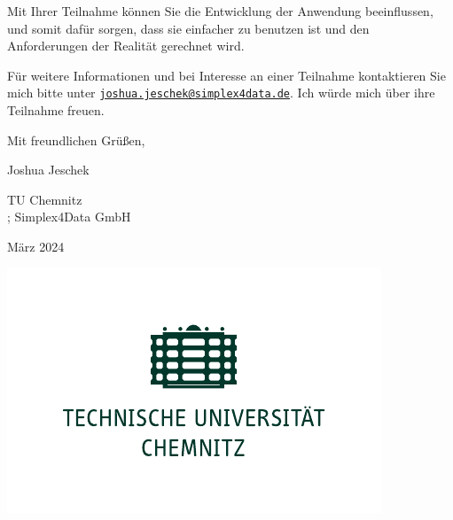 Mit Ihrer Teilnahme können Sie die Entwicklung der Anwendung beeinflussen, und somit dafür sorgen,
dass sie einfacher zu benutzen ist und den Anforderungen der Realität gerechnet wird.

Für weitere Informationen und bei Interesse an einer Teilnahme kontaktieren Sie mich bitte unter
\texttt{\href{mailto:joshua.jeschek@simplex4data.de}{joshua.jeschek@simplex4data.de}}. Ich würde
mich über ihre Teilnahme freuen.

\begin{flushright}
  Mit freundlichen Grüßen,

  Joshua Jeschek

  \vspace{\baselineskip}

  TU Chemnitz\ifdefined\STANDALONE\\\else{}; \fi
  Simplex4Data GmbH

  März 2024
\end{flushright}

\ifdefined\STANDALONE
  \vfill
  \begin{center}
    \includegraphics[scale=.75]{../assets/tuc.pdf}
  \end{center}
\fi
